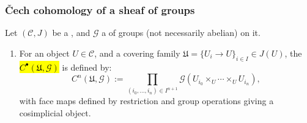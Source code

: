 









\subsubsection{\v{C}ech cohomology of a sheaf of groups}

\begin{definition}
Let $(\mathcal{C},J)$ be a , and $\mathcal{G}$ a  of groups (not necessarily abelian) on it. 
\begin{enumerate}
    \item For an object $U \in \mathcal{C}$, and a covering family $\mathfrak{U} = \{ U_i \to U \}_{i \in I} \in J(U)$, the  \hl{$C^\bullet(\mathfrak{U},\mathcal{G})$} is defined by:
    $$ C^n(\mathfrak{U},\mathcal{G}) := \prod_{(i_0,\ldots,i_n) \in I^{n+1}} \mathcal{G}(U_{i_0} \times_U \cdots \times_U U_{i_n}), $$
    with face maps defined by restriction and group operations giving a cosimplicial object.
\end{enumerate}
\end{definition}

